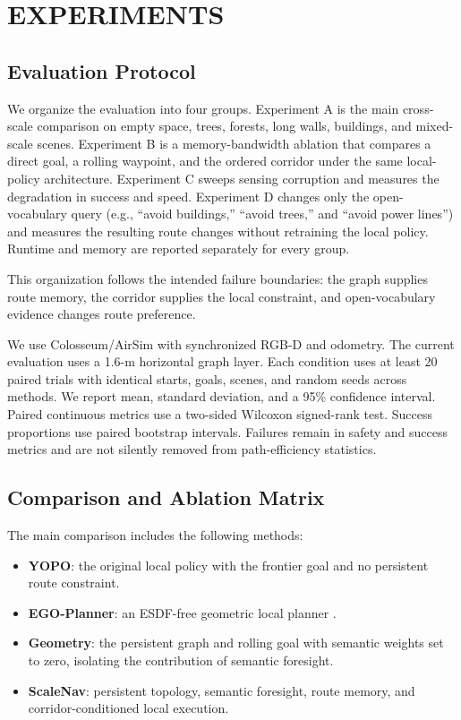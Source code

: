 \documentclass[letterpaper,10pt,conference]{ieeeconf}
\begin{document}
\section{EXPERIMENTS}
\label{sec:experiments}
\subsection{Evaluation Protocol}
We organize the evaluation into four groups.  Experiment A is the main
cross-scale comparison on empty space, trees, forests, long walls, buildings,
and mixed-scale scenes.  Experiment B is a memory-bandwidth ablation that
compares a direct goal, a rolling waypoint, and the ordered corridor under the
same local-policy architecture.  Experiment C sweeps sensing corruption and
measures the degradation in success and speed.  Experiment D changes only the
open-vocabulary query (e.g., ``avoid buildings,'' ``avoid trees,'' and ``avoid
power lines'') and measures the resulting route changes without retraining the
local policy.  Runtime and memory are reported separately for every group.

This organization follows the intended failure boundaries: the graph supplies
route memory, the corridor supplies the local constraint, and open-vocabulary
evidence changes route preference.

We use Colosseum/AirSim \cite{airsim} with synchronized RGB-D and odometry.
The current evaluation uses a 1.6-m horizontal graph layer.
Each condition uses at least 20 paired trials with identical starts, goals,
scenes, and random seeds across methods.
We report mean, standard deviation, and a 95\% confidence interval.
Paired continuous metrics use a two-sided Wilcoxon signed-rank test.
Success proportions use paired bootstrap intervals.
Failures remain in safety and success metrics and are not silently removed
from path-efficiency statistics.

\subsection{Comparison and Ablation Matrix}
The main comparison includes the following methods:
\begin{itemize}
  \item \textbf{YOPO}: the original local policy with the frontier goal and no
  persistent route constraint.
  \item \textbf{EGO-Planner}: an ESDF-free geometric local planner
  \cite{egoplanner}.
  \item \textbf{Geometry}: the persistent graph and rolling goal with
  semantic weights set to zero, isolating the contribution of semantic
  foresight.
  \item \textbf{ScaleNav}: persistent topology, semantic foresight, route
  memory, and corridor-conditioned local execution.
\end{itemize}
\end{document}
